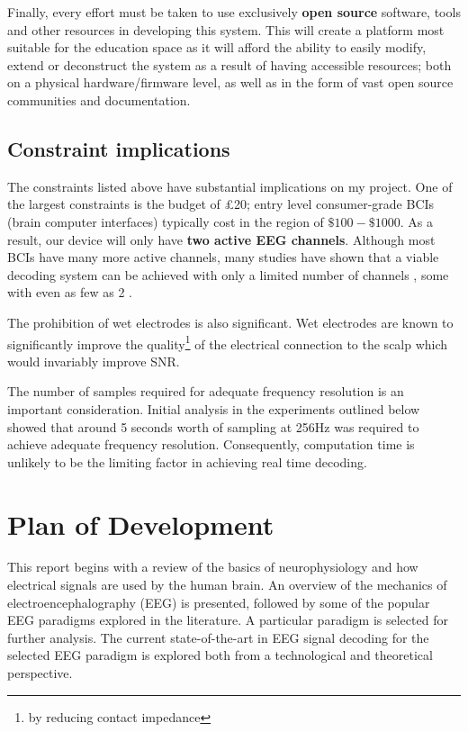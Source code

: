 Finally, every effort must be taken to use exclusively \textbf{open source} software, tools and other resources in developing this system. This will create a platform most suitable for the education space as it will afford the ability to easily modify, extend or deconstruct the system as a result of having accessible resources; both on a physical hardware/firmware level, as well as in the form of vast open source communities and documentation.

\subsection{Constraint implications}
The constraints listed above have substantial implications on my project. One of the largest constraints is the budget of £20; entry level consumer-grade BCIs (brain computer interfaces) typically cost in the region of $\$100-\$1000$. As a result, our device will only have \textbf{two active EEG channels}. Although most BCIs have many more active channels, many studies have shown that a viable decoding system can be achieved with only a limited number of channels \cite{Wang2011}, some with even as few as 2 \cite{acampora-dataset}. 

The prohibition of wet electrodes is also significant. Wet electrodes are known to significantly improve the quality\footnote{by reducing contact impedance} of the electrical connection to the scalp which would invariably improve SNR. 

The number of samples required for adequate frequency resolution is an important consideration. Initial analysis in the experiments outlined below showed that around 5 seconds worth of sampling at 256Hz was required to achieve adequate frequency resolution. Consequently, computation time is unlikely to be the limiting factor in achieving real time decoding.

\section{Plan of Development}
This report begins with a review of the basics of neurophysiology and how electrical signals are used by the human brain. An overview of the mechanics of electroencephalography (EEG) is presented, followed by some of the popular EEG paradigms explored in the literature. A particular paradigm is selected for further analysis. The current state-of-the-art in EEG signal decoding for the selected EEG paradigm is explored both from a technological and theoretical perspective. 

